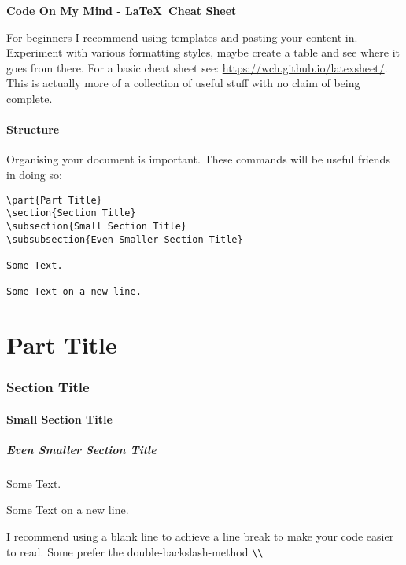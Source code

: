 \documentclass{article}
\begin{document}
\pagestyle{empty}

\begin{center}
    \Large\bfseries Code On My Mind - \LaTeX\ Cheat Sheet
\end{center}

For beginners I recommend using templates and pasting your content in. Experiment with various formatting styles, maybe create a table and see where it goes from there. For a basic cheat sheet see: \url{https://wch.github.io/latexsheet/}. This is actually more of a collection of useful stuff with no claim of being complete.

\subsection*{Structure}
Organising your document is important. These commands will be useful friends in doing so:
\begin{multicols}{2}

    \begin{lstlisting}[style=codeblock]
\part{Part Title}
\section{Section Title}
\subsection{Small Section Title}
\subsubsection{Even Smaller Section Title}

Some Text.

Some Text on a new line.
    \end{lstlisting}
    
    \columnbreak\vfill
    
    \part{Part Title}
    \section{Section Title}
    \subsection{Small Section Title}
    \subsubsection{Even Smaller Section Title}

    Some Text.

    Some Text on a new line.

\end{multicols}
I recommend using a blank line to achieve a line break to make your code easier to read. Some prefer the double-backslash-method \verb|\\|
\end{document}
